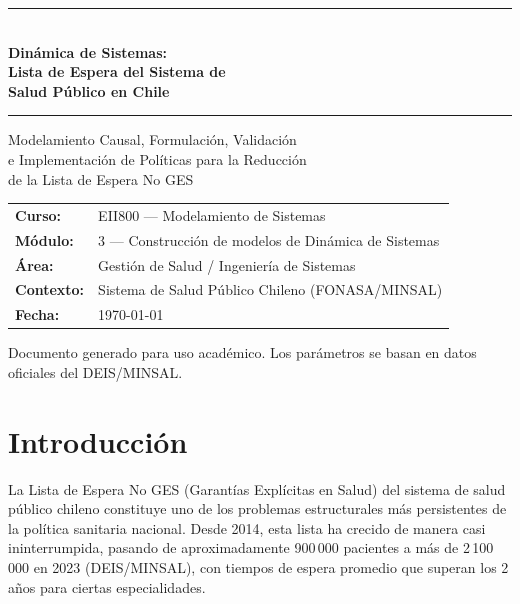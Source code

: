 \documentclass[12pt,a4paper]{article}
\begin{document}
\begin{titlepage}
\centering
\vspace*{1cm}
{\color{azulDS}\rule{\linewidth}{1.5pt}}\\[0.8em]
{\LARGE\bfseries Dinámica de Sistemas:\\[0.3em]
Lista de Espera del Sistema de\\[0.3em]
Salud Público en Chile}\\[0.6em]
{\color{azulDS}\rule{\linewidth}{1.5pt}}

\vspace{2cm}
{\large Modelamiento Causal, Formulación, Validación\\
e Implementación de Políticas para la Reducción\\
de la Lista de Espera No GES}

\vspace{3cm}
\begin{tabular}{ll}
\textbf{Curso:}    & EII800 — Modelamiento de Sistemas \\[4pt]
\textbf{Módulo:}   & 3 — Construcción de modelos de Dinámica de Sistemas \\[4pt]
\textbf{Área:}     & Gestión de Salud / Ingeniería de Sistemas \\[4pt]
\textbf{Contexto:} & Sistema de Salud Público Chileno (FONASA/MINSAL) \\[4pt]
\textbf{Fecha:}    & \today \\
\end{tabular}

\vfill
{\small\textcolor{grisOscuro}{Documento generado para uso académico.
Los parámetros se basan en datos oficiales del DEIS/MINSAL.}}
\end{titlepage}

\tableofcontents
\newpage

\section{Introducción}

La Lista de Espera No GES (Garantías Explícitas en Salud) del sistema de salud público chileno constituye uno de los problemas estructurales más persistentes de la política sanitaria nacional. Desde 2014, esta lista ha crecido de manera casi ininterrumpida, pasando de aproximadamente 900\,000 pacientes a más de 2\,100\,000 en 2023 (DEIS/MINSAL), con tiempos de espera promedio que superan los 2 años para ciertas especialidades.
\end{document}
